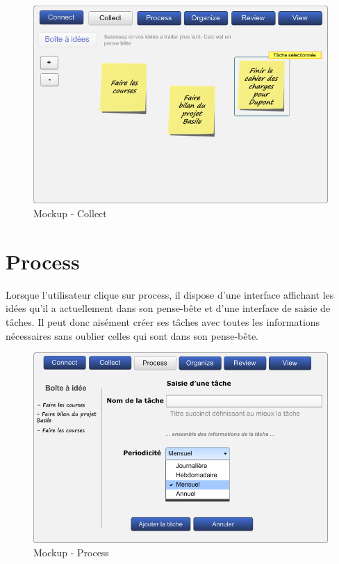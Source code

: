 \begin{figure}[H]
  \begin{center}
  \includegraphics[scale=0.5]{livrable2/images/collect.png}
  \caption{Mockup - Collect}
  \end{center}
\end{figure}

\section{Process}
Lorsque l'utilisateur clique sur process, il dispose d'une interface affichant
les idées qu'il a actuellement dans son pense-bête et d'une interface de saisie
de tâches. Il peut donc aisément créer ses tâches avec toutes les informations
nécessaires sans oublier celles qui sont dans son pense-bête.


\begin{figure}[H]
  \begin{center}
  \includegraphics[scale=0.5]{livrable2/images/process.png}
  \caption{Mockup - Process}
  \end{center}
\end{figure}


